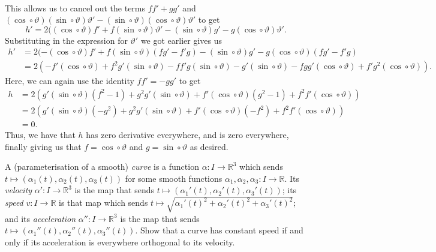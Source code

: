 \documentclass[12 pt, letterpaper]{hmcpset}
\begin{document}
\begin{solution}
\[\begin{split}
		\end{split}
	\]
	This allows us to cancel out the terms $f f' + g g'$ and $(\cos \circ \vartheta) (\sin \circ \vartheta) \vartheta' - (\sin \circ \vartheta) (\cos \circ \vartheta) \vartheta'$ to get
	\[
		h' = 2 ((\cos \circ \vartheta) f' + f (\sin \circ \vartheta) \vartheta' - (\sin \circ \vartheta) g' - g (\cos \circ \vartheta) \vartheta'.
	\]
	Substituting in the expression for $\vartheta'$ we got earlier gives us
	\[
		\begin{split}
			h' & = 2 (-(\cos \circ \vartheta) f' + f (\sin \circ \vartheta) (f g' - f' g) - (\sin \circ \vartheta) g' - g (\cos \circ \vartheta) (f g' - f' g) \\
			   & = 2( - f' (\cos \circ \vartheta) + f^2 g' (\sin \circ \vartheta) - f f' g (\sin \circ \vartheta) - g' (\sin \circ \vartheta) - f g g' (\cos \circ \vartheta) + f' g^2 (\cos \circ \vartheta) ). 
		\end{split}
	\]
	Here, we can again use the identity $f f' = - g g'$ to get
	\[
		\begin{split}
			h & = 2 (g' (\sin \circ \vartheta) (f^2 - 1) + g^2 g' (\sin \circ \vartheta) + f' (\cos \circ \vartheta) (g^2 - 1) + f^2 f' (\cos \circ \vartheta)) \\
			  & = 2 (g' (\sin \circ \vartheta) (-g^2) + g^2 g' (\sin \circ \vartheta) + f' (\cos \circ \vartheta) (- f^2) + f^2 f' (\cos \circ \vartheta)) \\
			  & = 0.
		\end{split}
	\]
	Thus, we have that $h$ has zero derivative everywhere, and is zero everywhere, finally giving us that $f = \cos \circ \vartheta$ and $g = \sin \circ \vartheta$ as desired.
\end{solution}

\pagebreak

\begin{problem}[Problem 5.]
	A (parameterisation of a smooth) \textit{curve} is a function $\alpha : I \to \mathbb{R}^3$ which sends $t \mapsto (\alpha_1(t), \alpha_2(t), \alpha_3(t))$ for some smooth functions $\alpha_1, \alpha_2, \alpha_3 : I \to \mathbb{R}$. Its \textit{velocity} $\alpha' : I \to \mathbb{R}^3$ is the map that sends $t \mapsto (\alpha_1'(t), \alpha_2'(t), \alpha_3'(t))$; its \textit{speed} $v : I \to \mathbb{R}$ is that map which sends $t \mapsto \sqrt{\alpha_1'(t)^2 + \alpha_2'(t)^2 + \alpha_3'(t)^2}$; and its \textit{acceleration} $\alpha'' : I \to \mathbb{R}^3$ is the map that sends $t \mapsto (\alpha_1''(t), \alpha_2''(t), \alpha_3''(t))$. Show that a curve has constant speed if and only if its acceleration is everywhere orthogonal to its velocity.
\end{problem}
\end{document}
